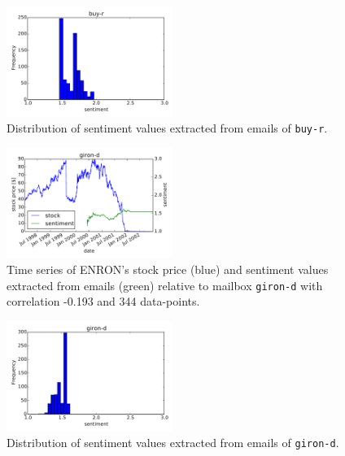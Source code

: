 \documentclass{vldb}
\begin{document}
\begin{figure}[h!]
\centering
\includegraphics[width=0.48\textwidth]{imgs/hist/sentiment_vs_stock_buy-r_hist.pdf}
\caption{Distribution of sentiment values extracted from emails of \texttt{buy-r}.}
\label{fig:sentiment_dist_hist_buy}
\end{figure}


\begin{figure}[h!]
\centering
\includegraphics[width=0.48\textwidth]{imgs/sentiment_vs_stock_giron-d.pdf}
\caption{Time series of ENRON's stock price (blue) and sentiment values
	extracted from emails (green) relative to mailbox \texttt{giron-d} with
correlation -0.193 and 344 data-points.}
\label{fig:sentiment_vs_stock_giron}
\end{figure}

\begin{figure}[h!]
\centering
\includegraphics[width=0.48\textwidth]{imgs/hist/sentiment_vs_stock_giron-d_hist.pdf}
\caption{Distribution of sentiment values extracted from emails of \texttt{giron-d}.}
\label{fig:sentiment_dist_hist_giron}
\end{figure}
\end{document}
